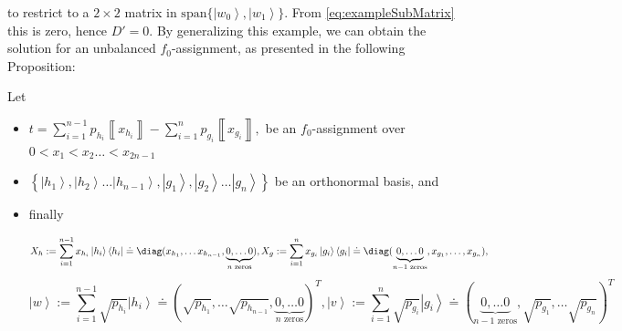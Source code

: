 \documentclass{article}
\begin{document}
to restrict to a $2\times2$ matrix in $\text{span}\{\left|w_{0}\right\rangle ,\left|w_{1}\right\rangle \}$.
From \ref{eq:exampleSubMatrix} this is zero,
hence $D'=0$. By generalizing this example, we can obtain the solution for an unbalanced $f_{0}$-assignment, as presented in the following Proposition:
\begin{proposition}\label{prop:unbalancedf0algeb}
  Let
  \begin{itemize}
    \item $
            t=\sum_{i=1}^{n-1}p_{h_{i}}\left\llbracket x_{h_{i}}\right\rrbracket -\sum_{i=1}^{n}p_{g_{i}}\left\llbracket x_{g_{i}}\right\rrbracket ,
          $ be an $f_{0}$-assignment over $0<x_{1}<x_{2}\dots<x_{2n-1}$
    \item $\left\{ \left|h_{1}\right\rangle ,\left|h_{2}\right\rangle \dots\left|h_{n-1}\right\rangle ,\left|g_{1}\right\rangle ,\left|g_{2}\right\rangle \dots\left|g_{n}\right\rangle \right\} $
          be an orthonormal basis, and
    \item finally
          \begin{footnotesize}
            \begin{displaymath}
              X_{h}:=\sum_{i=1}^{n-1}x_{h_{i}}\left|h_{i}\right\rangle \left\langle h_{i}\right|\doteq\diag(x_{h_{1}},\dots x_{h_{n-1}},\underbrace{0,\dots0}_{n\text{ zeros}}),
              X_{g}:=\sum_{i=1}^{n}x_{g_{i}}\left|g_{i}\right\rangle \left\langle g_{i}\right|\doteq\diag(\underbrace{0,\dots0}_{n-1\text{ zeros}},x_{g_{1}},\dots,x_{g_{n}}),
            \end{displaymath}
            \begin{displaymath}
              \left|w\right\rangle :=\sum_{i=1}^{n-1}\sqrt{p_{h_{i}}}\left|h_{i}\right\rangle \doteq(\sqrt{p_{h_{1}}},\dots\sqrt{p_{h_{n-1}}},\underbrace{0,\dots0}_{n\text{ zeros}})^{T},
              \left|v\right\rangle :=\sum_{i=1}^{n}\sqrt{p_{g_{i}}}\left|g_{i}\right\rangle \doteq(\underbrace{0,\dots0}_{n-1\text{ zeros}},\sqrt{p_{g_{1}}},\dots\sqrt{p_{g_{n}}})^{T}
            \end{displaymath}
          \end{footnotesize}


\end{itemize}
\end{proposition}
\end{document}
